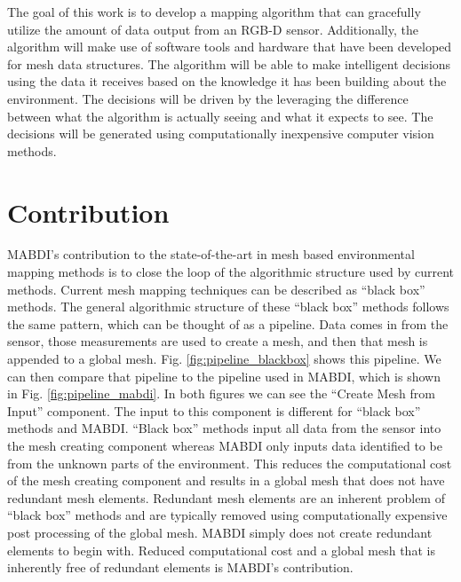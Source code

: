 The goal of this work is to develop a mapping algorithm that can gracefully
utilize the amount of data output from an RGB-D sensor. Additionally, the
algorithm will make use of software tools and hardware that have been developed
for mesh data structures. The algorithm will be able to make intelligent
decisions using the data it receives based on the knowledge it has been building
about the environment. The decisions will be driven by the leveraging the
difference between what the algorithm is actually seeing and what it expects to
see. The decisions will be generated using computationally inexpensive computer
vision methods.

\section{Contribution}

MABDI's contribution to the state-of-the-art in mesh based environmental mapping
methods is to close the loop of the algorithmic structure used by current
methods. Current mesh mapping techniques can be described as ``black box''
methods. The general algorithmic structure of these ``black box'' methods
follows the same pattern, which can be thought of as a pipeline. Data comes in
from the sensor, those measurements are used to create a mesh, and then that
mesh is appended to a global mesh. Fig. \ref{fig:pipeline_blackbox} shows this
pipeline. We can then compare that pipeline to the pipeline used in MABDI, which
is shown in Fig. \ref{fig:pipeline_mabdi}. In both figures we can see the
``Create Mesh from Input'' component. The input to this component is different
for ``black box'' methods and MABDI. ``Black box'' methods input all data from
the sensor into the mesh creating component whereas MABDI only inputs data
identified to be from the unknown parts of the environment. This reduces the
computational cost of the mesh creating component and results in a global mesh
that does not have redundant mesh elements. Redundant mesh elements are an
inherent problem of ``black box'' methods and are typically removed using
computationally expensive post processing of the global mesh. MABDI simply does
not create redundant elements to begin with. Reduced computational cost and a
global mesh that is inherently free of redundant elements is MABDI's
contribution.


